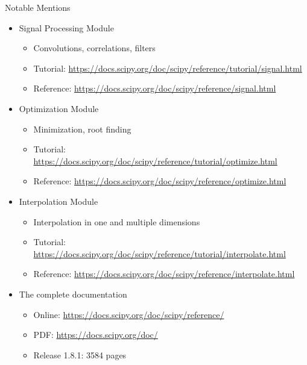 
\begin{frame}{Notable Mentions}
%
\begin{itemize}
\item Signal Processing Module
	\begin{itemize}
	\item Convolutions, correlations, filters
	\item Tutorial: {\scriptsize \url{https://docs.scipy.org/doc/scipy/reference/tutorial/signal.html}}
	\item Reference: {\scriptsize \url{https://docs.scipy.org/doc/scipy/reference/signal.html}}
	\end{itemize}
\item Optimization Module
	\begin{itemize}
	\item Minimization, root finding
	\item Tutorial: {\scriptsize \url{https://docs.scipy.org/doc/scipy/reference/tutorial/optimize.html}}
	\item Reference: {\scriptsize \url{https://docs.scipy.org/doc/scipy/reference/optimize.html}}
	\end{itemize}
\item Interpolation Module
	\begin{itemize}
	\item Interpolation in one and multiple dimensions
	\item Tutorial: {\scriptsize \url{https://docs.scipy.org/doc/scipy/reference/tutorial/interpolate.html}}
	\item Reference: {\scriptsize \url{https://docs.scipy.org/doc/scipy/reference/interpolate.html}}
	\end{itemize}
\item The complete documentation
	\begin{itemize}
	\item Online: {\scriptsize \url{https://docs.scipy.org/doc/scipy/reference/}}
	\item PDF: {\scriptsize \url{https://docs.scipy.org/doc/}}
	\item Release 1.8.1: 3584 pages
	\end{itemize}
\end{itemize}
%
\end{frame}

